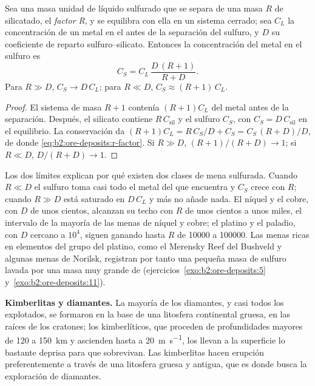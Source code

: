 \begin{proposition}[Factor R]\label{prop:b2:ore-deposits:r-factor}
Sea una masa unidad de líquido sulfurado que se separa de una masa $R$ de  silicatado, el
\emph{factor R}, y se equilibra con ella en un sistema cerrado; sea $C_L$ la concentración de un
metal en el  antes de la separación del sulfuro, y $D$ su coeficiente de reparto
sulfuro--silicato. Entonces la concentración del metal en el sulfuro es
\begin{equation}
C_S = C_L\,\frac{D\,(R + 1)}{R + D} .
\label{eq:b2:ore-deposits:r-factor}
\end{equation}
Para $R \gg D$, $C_S \to D\,C_L$; para $R \ll D$, $C_S \approx (R + 1)\,C_L$.
\end{proposition}

\begin{proof}
El sistema de masa $R + 1$ contenía $(R + 1)C_L$ del metal antes de la separación. Después, el silicato
contiene $R\,C_{\mathrm{sil}}$ y el sulfuro $C_S$, con $C_S = D\,C_{\mathrm{sil}}$ en el equilibrio.
La conservación da $(R + 1)C_L = R\,C_S/D + C_S = C_S\,(R + D)/D$, de donde
\eqref{eq:b2:ore-deposits:r-factor}. Si $R \gg D$, $(R + 1)/(R + D) \to 1$; si $R \ll D$,
$D/(R + D) \to 1$.
\end{proof}

Los dos límites explican por qué existen dos clases de mena sulfurada. Cuando $R \ll D$ el sulfuro toma
casi todo el metal del  que encuentra y $C_S$ crece con $R$; cuando $R \gg D$ está
saturado en $D\,C_L$ y más  no añade nada. El níquel y el cobre, con $D$ de unos cientos,
alcanzan su techo con $R$ de unos cientos a unos miles, el intervalo de la mayoría de las menas de níquel y
cobre; el platino y el paladio, con $D$ cercano a $10^4$, siguen ganando hasta $R$ de \num{10000} a
\num{100000}. Las menas ricas en elementos del grupo del platino, como el Merensky Reef del Bushveld y
algunas menas de Norilsk, registran por tanto una pequeña masa de sulfuro lavada por una masa muy grande de
 (ejercicios~\ref{exo:b2:ore-deposits:5} y~\ref{exo:b2:ore-deposits:11}).

\textbf{Kimberlitas y diamantes.} La mayoría de los diamantes, y casi todos los explotados, se formaron en la base de
una litosfera continental gruesa, en las raíces de los cratones; los  kimberlíticos, que proceden de profundidades
mayores de 120 a \qty{150}{km} y ascienden hasta a \qty{20}{m.s^{-1}}, los llevan a la
superficie lo bastante deprisa para que sobrevivan. Las kimberlitas hacen erupción preferentemente a través de una litosfera gruesa y antigua,
que es donde busca la exploración de diamantes.

